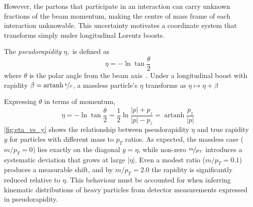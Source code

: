     However, the partons that participate in an interaction can carry unknown fractions of the beam momentum, making the centre of mass frame of each interaction unknowable.
    This uncertainty motivates a coordinate system that transforms simply under longitudinal Lorentz boosts.
    \begin{definition}
        The \emph{pseudorapidity} \(\eta,\) is defined as
        \[
            \eta = -\ln \tan\frac\theta2
            \]
        where \(\theta\) is the polar angle from the beam axis~\cite{rubbia_phenomenology_2022}.
        Under a longitudinal boost with rapidity \(\beta = \operatorname{artanh}\nicefrac{v}{c}\), a massless particle's \(\eta\) transforms as \(\eta\mapsto\eta+\beta\)
    \end{definition}
    Expressing \(\theta\) in terms of momentum,
    \[
        \eta = -\ln \tan \frac\theta2 = \frac12\ln\frac{|p| + p_z}{|p| - p_z} = \operatorname{artanh}\frac{p_z}{|p|}
    \]
    \cref{fig:eta_vs_y} shows the relationship between pseudorapidity $\eta$ and true rapidity $y$ for particles with different mass to $p_T$ ratios.
    As expected, the massless case ($m/p_T=0$) lies exactly on the diagonal $y=\eta$, while non-zero $\nicefrac{m}{p_T}$ introduces a systematic deviation that grows at large $|\eta|$.
    Even a modest ratio ($m/p_T=0.1$) produces a measurable shift, and by $m/p_T=2.0$ the rapidity is significantly reduced relative to $\eta$.
    This behaviour must be accounted for when inferring kinematic distributions of heavy particles from detector measurements expressed in pseudorapidity.
    

